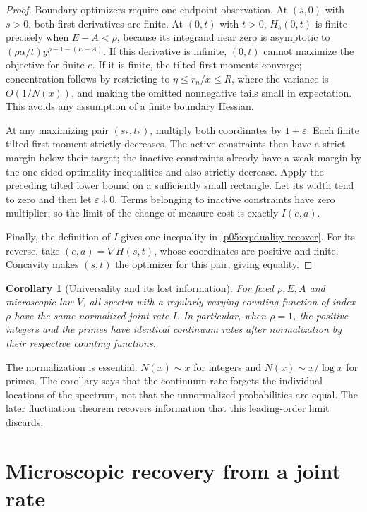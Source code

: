 \documentclass[11pt,letterpaper]{article}
\newtheorem{corollary}[theorem]{Corollary}
\theoremstyle{definition}
\theoremstyle{remark}
\newcommand{\1}{\mathbf 1}
\begin{document}
\begin{proof}
Boundary optimizers require one endpoint observation. At $(s,0)$ with
$s>0$, both first derivatives are finite. At $(0,t)$ with $t>0$,
$H_s(0,t)$ is finite precisely when $E-A<\rho$, because its integrand
near zero is asymptotic to $(\rho\alpha/t)y^{\rho-1-(E-A)}$.
If this derivative is infinite, $(0,t)$ cannot maximize the objective
for finite $e$. If it is finite, the tilted first moments converge;
concentration follows by restricting to $\eta\le r_n/x\le R$, where
the variance is $O(1/N(x))$, and making the omitted nonnegative tails
small in expectation. This avoids any assumption of a finite boundary
Hessian.

At any maximizing pair $(s_*,t_*)$, multiply both coordinates by
$1+\varepsilon$. Each finite tilted first moment strictly decreases.
The active constraints then have a strict margin below their target;
the inactive constraints already have a weak margin by the
one-sided optimality inequalities and also strictly decrease. Apply
the preceding tilted lower bound on a sufficiently small rectangle.
Let its width tend to zero and then let $\varepsilon\downarrow0$.
Terms belonging to inactive constraints have zero multiplier, so the
limit of the change-of-measure cost is exactly $I(e,a)$.

Finally, the definition of $I$ gives one inequality in
\eqref{p05:eq:duality-recover}. For its reverse, take
$(e,a)=\nabla H(s,t)$, whose coordinates are positive and finite.
Concavity makes $(s,t)$ the optimizer for this pair, giving equality.
\end{proof}

\begin{corollary}[Universality and its lost information]\label{p05:cor:support-universality}
For fixed $\rho,E,A$ and microscopic law $V$, all spectra with a
regularly varying counting function of index $\rho$ have the same
normalized joint rate $I$. In particular, when $\rho=1$, the positive
integers and the primes have identical continuum rates after
normalization by their respective counting functions.
\end{corollary}

The normalization is essential: $N(x)\sim x$ for integers and
$N(x)\sim x/\log x$ for primes. The corollary says that the continuum
rate forgets the individual locations of the spectrum, not that the
unnormalized probabilities are equal. The later fluctuation theorem
recovers information that this leading-order limit discards.


\section{Microscopic recovery from a joint rate}
\label{p05:sec:inverse}
\end{document}
